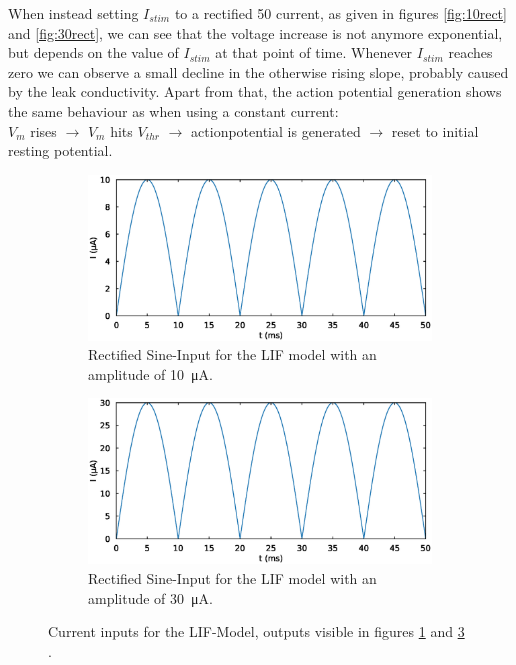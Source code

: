 \documentclass{scrartcl}			%
\begin{document}
\newline
\newline
When instead setting  $I_{stim}$ to a rectified \SI{50}{\herz}  current, as given in figures \ref{fig:10rect}  and \ref{fig:30rect}, we can see that the voltage increase is not anymore exponential, but depends on the value of  $I_{stim}$ at that point of time. Whenever  $I_{stim}$ reaches zero we can observe a small decline in the otherwise rising slope, probably caused by the leak conductivity. Apart from that, the action potential generation shows the same behaviour as when using a constant current:\\
$V_{m}$ rises $\rightarrow$  $V_{m}$ hits $V_{thr}$ $\rightarrow$ actionpotential is generated $\rightarrow$ reset to initial resting potential.

\begin{figure}[H]	
	\centering
	\begin{subfigure}[b]{\textwidth}			%
	\centering
		\includegraphics[width=0.8\linewidth]{imgs/1e-05muA_rectSign.eps}
		\caption{Rectified Sine-Input for the LIF model with an amplitude of \SI{10}{\micro\ampere}.}
		\label{fig:10_r} %
	\end{subfigure}

	\begin{subfigure}[b]{\textwidth}					%
	\centering
		\includegraphics[width=0.8\linewidth]{imgs/3e-05muA_rectSign.eps}
		\caption{Rectified Sine-Input for the LIF model with an amplitude of \SI{30}{\micro\ampere}.}
		\label{fig:30_r} %
	\end{subfigure}
	\caption{Current inputs for the LIF-Model, outputs visible in figures \ref{fig:10_r} and \ref{fig:30_r} .}
\end{figure}
\end{document}
